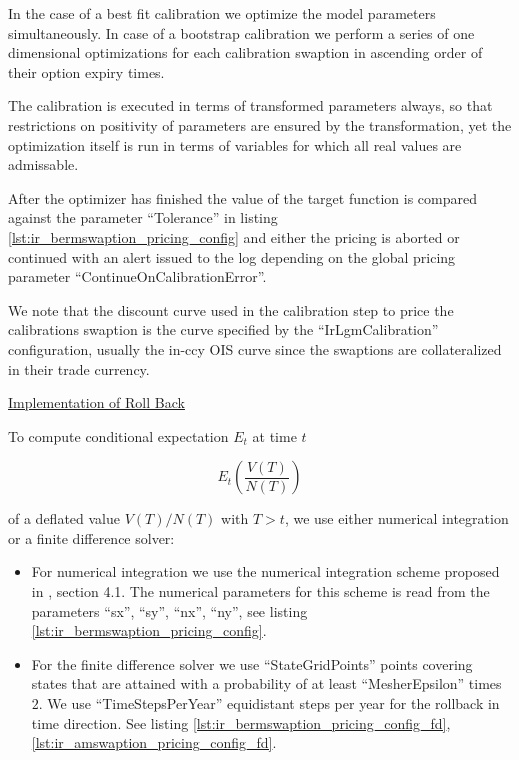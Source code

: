 In the case of a best fit calibration we optimize the model parameters simultaneously. In case of a bootstrap
calibration we perform a series of one dimensional optimizations for each calibration swaption in ascending order of
their option expiry times.

The calibration is executed in terms of transformed parameters always, so that restrictions on positivity of parameters
are ensured by the transformation, yet the optimization itself is run in terms of variables for which all real values
are admissable.

After the optimizer has finished the value of the target function is compared against the parameter ``Tolerance'' in
listing \ref{lst:ir_bermswaption_pricing_config} and either the pricing is aborted or continued with an alert issued to the log
depending on the global pricing parameter ``ContinueOnCalibrationError''.

We note that the discount curve used in the calibration step to price the calibrations swaption is the curve specified
by the ``IrLgmCalibration'' configuration, usually the in-ccy OIS curve since the swaptions are collateralized in their
trade currency.


\underline{Implementation of Roll Back}

To compute conditional expectation $E_t$ at time $t$

\begin{equation}
  E_t \left( \frac{V(T)}{N(T)} \right)
\end{equation}

of a deflated value $V(T) / N(T)$ with $T>t$, we use either numerical integration or a finite difference solver:

\begin{itemize}
\item For numerical integration we use the numerical integration scheme proposed in \cite{Hagan_Bermudan},
section 4.1. The numerical parameters for this scheme is read from the parameters ``sx'', ``sy'', ``nx'', ``ny'', see
listing \ref{lst:ir_bermswaption_pricing_config}.
\item For the finite difference solver we use ``StateGridPoints'' points covering states that are attained
with a probability of at least ``MesherEpsilon'' times $2$. We use ``TimeStepsPerYear'' equidistant steps per year for
the rollback in time direction. See
listing \ref{lst:ir_bermswaption_pricing_config_fd}, \ref{lst:ir_amswaption_pricing_config_fd}.
\end{itemize}

